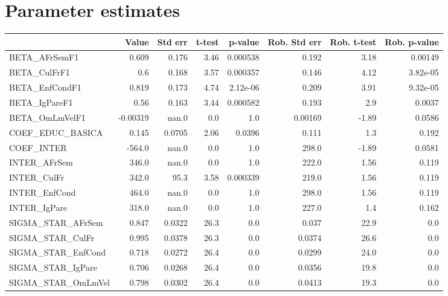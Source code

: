 \section{Parameter estimates}
\begin{tabular}{lrrrrrrr}
\toprule
{} &    Value &  Std err &  t-test &  p-value &  Rob. Std err &  Rob. t-test &  Rob. p-value \\
\midrule
BETA\_AFrSemF1      &    0.609 &    0.176 &    3.46 & 0.000538 &         0.192 &         3.18 &       0.00149 \\
BETA\_CulFrF1       &      0.6 &    0.168 &    3.57 & 0.000357 &         0.146 &         4.12 &      3.82e-05 \\
BETA\_EnfCondF1     &    0.819 &    0.173 &    4.74 & 2.12e-06 &         0.209 &         3.91 &      9.32e-05 \\
BETA\_IgPareF1      &     0.56 &    0.163 &    3.44 & 0.000582 &         0.193 &          2.9 &        0.0037 \\
BETA\_OmLmVelF1     & -0.00319 &    nan.0 &     0.0 &      1.0 &       0.00169 &        -1.89 &        0.0586 \\
COEF\_EDUC\_BASICA   &    0.145 &   0.0705 &    2.06 &   0.0396 &         0.111 &          1.3 &         0.192 \\
COEF\_INTER         &   -564.0 &    nan.0 &     0.0 &      1.0 &         298.0 &        -1.89 &        0.0581 \\
INTER\_AFrSem       &    346.0 &    nan.0 &     0.0 &      1.0 &         222.0 &         1.56 &         0.119 \\
INTER\_CulFr        &    342.0 &     95.3 &    3.58 & 0.000339 &         219.0 &         1.56 &         0.119 \\
INTER\_EnfCond      &    464.0 &    nan.0 &     0.0 &      1.0 &         298.0 &         1.56 &         0.119 \\
INTER\_IgPare       &    318.0 &    nan.0 &     0.0 &      1.0 &         227.0 &          1.4 &         0.162 \\
SIGMA\_STAR\_AFrSem  &    0.847 &   0.0322 &    26.3 &      0.0 &         0.037 &         22.9 &           0.0 \\
SIGMA\_STAR\_CulFr   &    0.995 &   0.0378 &    26.3 &      0.0 &        0.0374 &         26.6 &           0.0 \\
SIGMA\_STAR\_EnfCond &    0.718 &   0.0272 &    26.4 &      0.0 &        0.0299 &         24.0 &           0.0 \\
SIGMA\_STAR\_IgPare  &    0.706 &   0.0268 &    26.4 &      0.0 &        0.0356 &         19.8 &           0.0 \\
SIGMA\_STAR\_OmLmVel &    0.798 &   0.0302 &    26.4 &      0.0 &        0.0413 &         19.3 &           0.0 \\
\bottomrule
\end{tabular}


